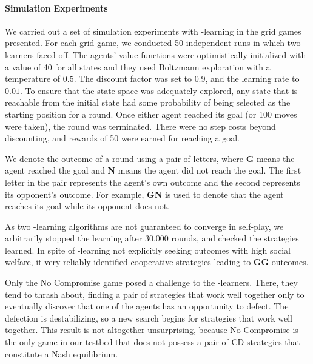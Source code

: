 
\vspace{\up}
\paragraph{Simulation Experiments}
\label{sec:qlearning}

We carried out a set of simulation experiments with \Q-learning in
the grid games presented.
%
For each grid game, we conducted 50 independent runs in which two
\Q-learners faced off.  
The agents' value functions were optimistically initialized with a
value of 40 for all states and they used Boltzmann exploration with a
temperature of $0.5$.  The discount factor was set to $0.9$, and the
learning rate to $0.01$.  To ensure that the state space was
adequately explored, any state that is reachable from the initial
state had some probability of being selected as the starting position
for a round.  Once either agent reached its goal (or 100 moves were
taken), the round was terminated.  There were no step costs beyond
discounting, and rewards of 50 were earned for reaching a goal.

We denote the outcome of a round using a pair of letters, where {\bf G} 
means the agent reached the goal and {\bf N} means the agent did not
reach the goal. The first letter in the pair represents the agent's
own outcome and the second represents its opponent's outcome. For
example, {\bf GN} is used to denote that the agent reaches its goal
while its opponent does not.

As two \Q-learning algorithms are not guaranteed to converge in
self-play, we arbitrarily stopped the learning after 30,000 rounds,
and checked the strategies learned.  In spite of \Q-learning not
explicitly seeking outcomes with high social welfare, it very reliably
identified cooperative strategies leading to {\bf GG} outcomes.

Only the No Compromise game posed a challenge to the \Q-learners.
There, they tend to thrash about, finding a pair of strategies that
work well together only to eventually discover that one of the agents
has an opportunity to defect.  The defection is destabilizing, so a
new search begins for strategies that work well together.  This result
is not altogether unsurprising, because No Compromise is the only game
in our testbed that does not possess a pair of CD strategies that
constitute a Nash equilibrium.


